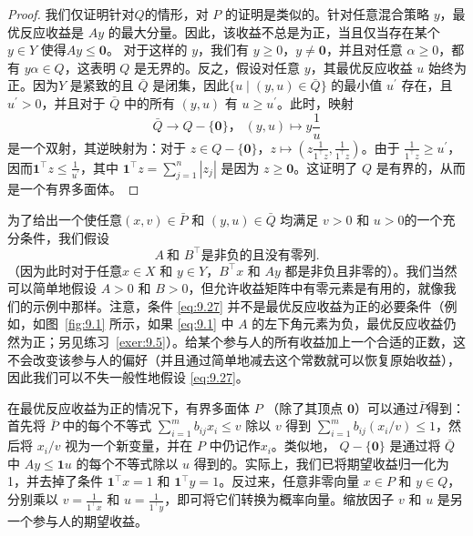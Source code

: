 \begin{proof}
我们仅证明针对$Q$的情形，对 $P$ 的证明是类似的。针对任意混合策略 $y$，最优反应收益是 $Ay$ 的最大分量。因此，该收益不总是为正，当且仅当存在某个 $y \in Y$ 使得$
Ay \leq \mathbf{0}$。
对于这样的 $y$，我们有 $y \geq 0$，$y \neq \mathbf{0}$，并且对任意 $\alpha \geq 0$，都有 $y\alpha \in Q$，这表明 $Q$ 是无界的。反之，假设对任意 $y$，其最优反应收益 $u$ 始终为正。因为\(Y\) 是紧致的且 \(\bar{Q}\) 是闭集，因此\(\{ u \mid  \left( {y,u}\right)  \in  \bar{Q}\}\) 的最小值 \({u}^{\prime }\) 存在，且 \({u}^{\prime } > 0\)，并且对于 \(\bar{Q}\) 中的所有 $(y, u)$ 有 \(u \geq  {u}^{\prime }\)。此时，映射
\begin{equation}
\label{eq:9.26}
\bar{Q} \rightarrow  Q - \{ \mathbf{0}\}，\;\left( {y,u}\right)  \mapsto  y\frac{1}{u}
\end{equation}
是一个双射，其逆映射为：对于 \(z \in  Q - \{ \mathbf{0}\}\)，\(z \mapsto  \left( {z\frac{1}{{1}^{\top }z},\frac{1}{{1}^{\top }z}}\right)\)。由于 \(\frac{1}{{1}^{\top }z} \geq  {u}^{\prime }\)，因而\({\mathbf{1}}^{\top }z \leq  \frac{1}{{u}^{\prime }}\)，其中 \({\mathbf{1}}^{\top }z = \mathop{\sum }\limits_{{j = 1}}^{n}\left| {z}_{j}\right|\) 是因为 \(z \geq  \mathbf{0}\)。这证明了 \(Q\) 是有界的，从而是一个有界多面体。
\end{proof}




为了给出一个使任意$(x,v)\in \bar{P}$ 和 $(y, u)\in \bar{Q}$ 均满足 \(v > 0\) 和 \(u > 0\)的一个充分条件，我们假设
\begin{equation}\label{eq:9.27}
A ~\mbox{和 } {B}^{\top } \mbox{是非负的且没有零列}.
\end{equation}
（因为此时对于任意\(x \in  X\) 和 \(y \in  Y\)，\({B}^{\top }x\) 和 \({Ay}\) 都是非负且非零的）。我们当然可以简单地假设 \(A > 0\) 和 \(B > 0\)，但允许收益矩阵中有零元素是有用的，就像我们的示例中那样。注意，条件 \eqref{eq:9.27} 并不是最优反应收益为正的必要条件（例如，如图~\ref{fig:9.1} 所示，如果 \eqref{eq:9.1} 中 \(A\) 的左下角元素为负，最优反应收益仍然为正；另见练习~\ref{exer:9.5}）。给某个参与人的所有收益加上一个合适的正数，这不会改变该参与人的偏好（并且通过简单地减去这个常数就可以恢复原始收益），因此我们可以不失一般性地假设 \eqref{eq:9.27}。


在最优反应收益为正的情况下，有界多面体 \(P\) （除了其顶点 $\mathbf{0}$）可以通过\(\bar{P}\)得到：首先将 \(\bar{P}\) 中的每个不等式 \(\mathop{\sum }\limits_{{i = 1}}^{m}{b}_{ij}{x}_{i} \leq  v\) 除以 \(v\) 得到 \(\mathop{\sum }\limits_{{i = 1}}^{m}{b}_{ij}\left( {{x}_{i}/v}\right)  \leq  1\)，然后将 \({x}_{i}/v\) 视为一个新变量，并在 \(P\) 中仍记作\({x}_{i}\)。类似地， \(Q - \{ \mathbf{0}\}\) 是通过将 \(\bar{Q}\) 中 \({Ay} \leq  \mathbf{1}u\) 的每个不等式除以 \(u\) 得到的。实际上，我们已将期望收益归一化为 1，并去掉了条件 \({\mathbf{1}}^{\top }x = 1\) 和 \({\mathbf{1}}^{\top }y = 1\)。反过来，任意非零向量 \(x \in  P\) 和 \(y \in  Q\)，分别乘以 \(v = \frac{1}{{1}^{\top }x}\) 和 \(u = \frac{1}{{1}^{\top }y}\)，即可将它们转换为概率向量。缩放因子 \(v\) 和 \(u\) 是另一个参与人的期望收益。


